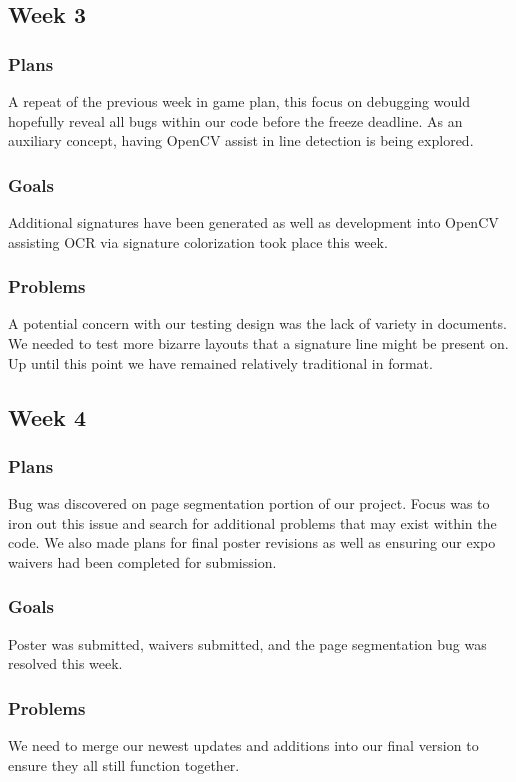 \documentclass[onecolumn, draftclsnofoot,10pt, compsoc]{IEEEtran}
\begin{document}
\subsection{Week 3}
\subsubsection{Plans}
A repeat of the previous week in game plan, this focus on debugging would hopefully reveal all bugs within our code before the freeze deadline. As an auxiliary concept, having OpenCV assist in line detection is being explored.

\subsubsection{Goals}
Additional signatures have been generated as well as development into OpenCV assisting OCR via signature colorization took place this week. 

\subsubsection{Problems}
A potential concern with our testing design was the lack of variety in documents. We needed to test more bizarre layouts that a signature line might be present on. Up until this point we have remained relatively traditional in format.

\subsection{Week 4}
\subsubsection{Plans}
Bug was discovered on page segmentation portion of our project. Focus was to iron out this issue and search for additional problems that may exist within the code. We also made plans for final poster revisions as well as ensuring our expo waivers had been completed for submission.

\subsubsection{Goals}
Poster was submitted, waivers submitted, and the page segmentation bug was resolved this week.  

\subsubsection{Problems}
We need to merge our newest updates and additions into our final version to ensure they all still function together.
\end{document}
